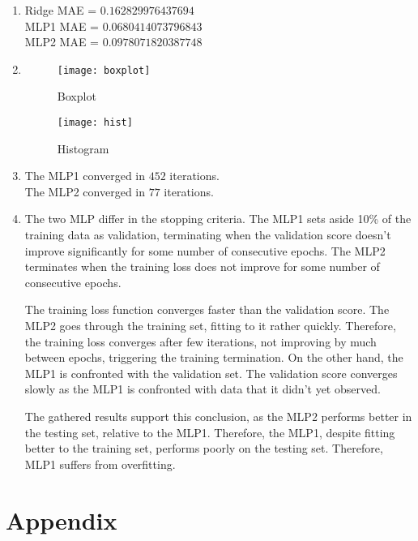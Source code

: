 \documentclass[12pt,a4paper]{article}
\newcommand{\ridgemae} {
	0.162829976437694
}
\newcommand{\mlponemae} {
	0.0680414073796843
}
\newcommand{\mlptwomae} {
	0.0978071820387748
}
\newcommand{\mlponeiterations} {
	452
}
\newcommand{\mlptwoiterations} {
	77
}
\begin{document}
\begin{enumerate}[resume]
	\item
	      Ridge MAE = $\ridgemae$ \\
	      MLP1 MAE =  $\mlponemae$ \\
	      MLP2 MAE = $\mlptwomae$

	      \pagebreak

	\item \mbox{}
	      \begin{figure}[h]
	      	\centering
	      	\texttt{[image: boxplot]}
	      	\caption{Boxplot}
	      	\texttt{[image: hist]}
	      	\caption{Histogram}
	      \end{figure}

	      \pagebreak

	\item
	      The MLP1 converged in $\mlponeiterations$ iterations. \\
	      The MLP2 converged in $\mlptwoiterations$ iterations.

	\item
		The two MLP differ in the stopping criteria. The MLP1 sets
		aside 10\% of the training data as validation, terminating when
		the validation score doesn't improve significantly for some
		number of consecutive epochs.  The MLP2 terminates when the
		training loss does not improve for some number of consecutive
		epochs.

		The training loss function converges faster than the validation
		score.  The MLP2 goes through the training set, fitting to it
		rather quickly.  Therefore, the training loss converges after
		few iterations, not improving by much between epochs,
		triggering the training termination. On the other hand, the
		MLP1 is confronted with the validation set. The validation
		score converges slowly as the MLP1 is confronted with data that
		it didn't yet observed.

		The gathered results support this conclusion, as the MLP2
		performs better in the testing set, relative to the MLP1.
		Therefore, the MLP1, despite fitting better to the training
		set, performs poorly on the testing set.  Therefore, MLP1
		suffers from overfitting.

\end{enumerate}

\pagebreak

\section{Appendix}

\end{document}
